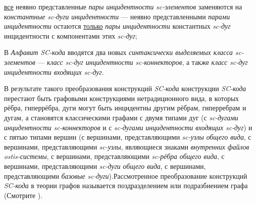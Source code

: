 \begin{SCn}
\begin{scnsubstruct}
\begin{scneqtoset}
{                \begin{scnitemize}
                    \item \uline{все} неявно представленные \textit{пары инцидентности sc-элементов} заменяются на \textit{константные sc-дуги инцидентности} --- неявно представленными \textit{парами инцидентности} остаются \uline{только} \textit{пары инцидентности} константных \textit{sc-дуг} инцидентности с компонентами этих \textit{sc-дуг};
                    \item В \textit{Алфавит SC-кода} вводятся два новых \textit{синтаксически выделяемых класса sc-элементов} --- \textit{класс sc-дуг инцидентности sc-коннекторов}, а также \textit{класс sc-дуг инцидентности входящих sc-дуг}.
                \end{scnitemize}
                В результате такого преобразования конструкций \textit{SC-кода} конструкции \textit{SC-кода} перестают быть графовыми конструкциями нетрадиционного вида, в которых рёбра, гиперрёбра, дуги могут быть инцидентны другим рёбрам, гиперребрам и дугам, а становятся классическими графами с двумя типами дуг (с \textit{sc-дугами инцидентности sc-коннекторов} и с \textit{sc-дугами инцидентности входящих sc-дуг}) и с пятью типами вершин (с вершинами, представляющими \textit{sc-узлы общего вида}, с вершинами, представляющими \textit{sc-узлы}, являющиеся знаками \textit{внутренних файлов ostis-системы}, с вершинами, представляющими \textit{sc-рёбра общего вида}, с вершинами, представляющими \textit{sc-дуги общего вида}, с вершинами, представляющими \textit{базовые sc-дуги}).Рассмотренное преобразование конструкций \textit{SC-кода} в теории графов называется поздразделением или подразбиением графа (Смотрите \cite{Trudeau1993}).}
            \end{scneqtoset}
            \scnendsegmentcomment
            \bigskip
        \end{scnsubstruct}
    \scnendcurrentsectioncomment
    
    \end{SCn}
    \label{sd_sc_code_syntax}
    \label{sd_sc_code_semantic}